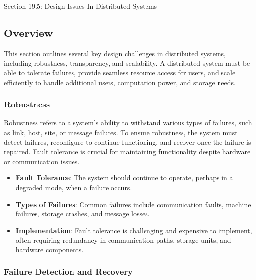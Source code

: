 \begin{notes}{Section 19.5: Design Issues In Distributed Systems}
    \subsection*{Overview}

    This section outlines several key design challenges in distributed systems, including robustness, transparency, and scalability. A distributed system must be able to tolerate failures, provide 
    seamless resource access for users, and scale efficiently to handle additional users, computation power, and storage needs.
    
    \subsubsection*{Robustness}
    
    Robustness refers to a system's ability to withstand various types of failures, such as link, host, site, or message failures. To ensure robustness, the system must detect failures, reconfigure 
    to continue functioning, and recover once the failure is repaired. Fault tolerance is crucial for maintaining functionality despite hardware or communication issues.
    
    \begin{highlight}[Robustness]
    
        \begin{itemize}
            \item \textbf{Fault Tolerance}: The system should continue to operate, perhaps in a degraded mode, when a failure occurs.
            \item \textbf{Types of Failures}: Common failures include communication faults, machine failures, storage crashes, and message losses.
            \item \textbf{Implementation}: Fault tolerance is challenging and expensive to implement, often requiring redundancy in communication paths, storage units, and hardware components.
        \end{itemize}
    
    \end{highlight}
    
    \subsubsection*{Failure Detection and Recovery}
    

\end{notes}
